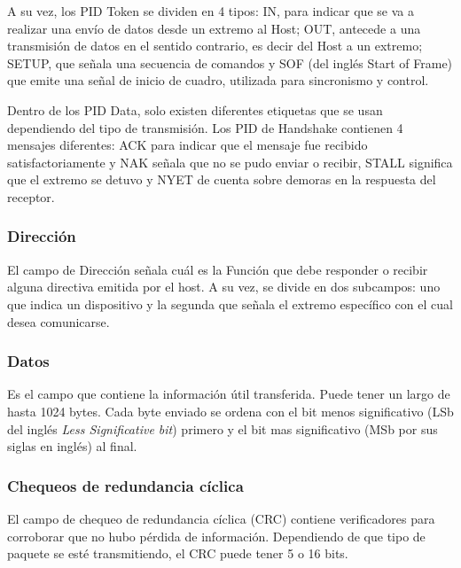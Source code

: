 		A su vez, los PID Token se dividen en 4 tipos: IN, para indicar que se va a realizar una envío de datos desde un extremo al Host; OUT, antecede a una transmisión de datos en el sentido contrario, es decir del Host a un extremo; SETUP, que señala una secuencia de comandos y SOF (del inglés {Start of Frame)} que emite una señal de inicio de cuadro, utilizada para sincronismo y control.%
	
		Dentro de los PID Data, solo existen diferentes etiquetas que se usan dependiendo del tipo de transmisión. Los PID de Handshake contienen 4 mensajes diferentes: ACK para indicar que el mensaje fue recibido satisfactoriamente y NAK señala que no se pudo enviar o recibir, STALL significa que el extremo se detuvo y NYET de cuenta sobre demoras en la respuesta del receptor.
	
	\subsubsection*{Dirección}
		El campo de Dirección señala cuál es la Función que debe responder o recibir alguna directiva emitida por el host. A su vez, se divide en dos subcampos: uno que indica un dispositivo y la segunda que señala el extremo específico con el cual desea comunicarse.

	\subsubsection*{Datos}
		Es el campo que contiene la información útil transferida. Puede tener un largo de hasta 1024 bytes. Cada byte enviado se ordena con el bit menos significativo (LSb del inglés {\it Less Significative bit}) primero y el bit mas significativo (MSb por sus siglas en inglés) al final.

	\subsubsection*{Chequeos de redundancia cíclica}
		El campo de chequeo de redundancia cíclica (CRC) contiene verificadores para corroborar que no hubo pérdida de información. Dependiendo de que tipo de paquete se esté transmitiendo, el CRC puede tener 5 o 16 bits. 
%	
	
